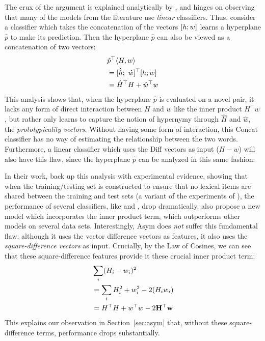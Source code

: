 The crux of the argument is explained analytically by
, and hinges on observing that many of the models from
the literature use {\em linear} classifiers. Thus, consider a
classifier which takes the concatenation of the vectors $[h; w]$ learns a
hyperplane $\hat p$ to make its prediction. Then the hyperplane $\hat p$ can
also be viewed as a concatenation of two vectors:
\begin{align*}
  & \hat p^\top \langle H, w\rangle\\
  & = [\hat h;~\hat w]^\top [h; w]\\
  & = \hat H^\top H + \hat w^\top w
\end{align*}
This analysis shows that, when the hyperplane $\hat p$ is evaluated on a novel
pair, it lacks any form of direct interaction between $H$ and $w$ like the
inner product $H^\top w$, but rather only learns to capture the notion of
hypernymy through $\hat H$ and $\hat w$, the {\em prototypicality vectors}.
Without having some form of interaction, this Concat classifier has no way
of estimating the relationship between the two words. Furthermore, a linear classifier
which uses the Diff vectors as input ($H - w$) will also have this flaw,
since the hyperplane $\hat p$ can be analyzed in this same fashion.

In their work,  back up this analysis with experimental
evidence, showing that when the training/testing set is constructed to
ensure that no lexical items are shared between the training and test sets
(a variant of the experiments of ), the performance
of several classifiers, like  and
, drop dramatically.  also
propose a new model which incorporates the inner product term, which
outperforms other models on several data sets.
Interestingly, Asym does {\em not} suffer this fundamental flaw: although it uses the
vector difference vectors as features, it also uses the {\em square-difference
vectors} as input. Crucially, by the Law of Cosines, we can see that these
square-difference features provide it these crucial inner product term:
\begin{align*}
  & \sum_i (H_i - w_i)^2\\
  & = \sum_i H_i^2 + w_i^2 - 2({H}_i{w}_i)\\
  & = H^\top H + w^\top w - 2{\bf H^\top{w}}
\end{align*}
This explains our observation in Section~\ref{sec:asym} that, without these
square-difference terms, performance drops substantially.

